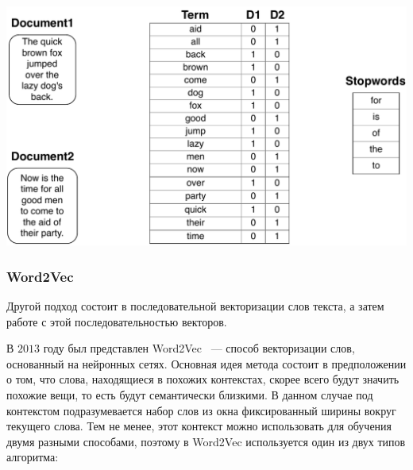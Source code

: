 \documentclass[../diploma.tex]{subfiles}
\begin{document}
   	\begin{minipage}{\linewidth}
   	    \centering
		\includegraphics[width=0.9\linewidth]{images/bag_of_words.pdf}
		\label{fig:bag_of_words}
   	\end{minipage}
    	
	\subsubsection{Word2Vec} 

	Другой подход состоит в последовательной векторизации слов текста, а затем работе с этой последовательностью векторов.

	В $2013$ году был представлен Word2Vec \cite{article:word2vec}~--- способ векторизации слов, основанный на нейронных сетях.
	Основная идея метода состоит в предположении о том, что слова, находящиеся в похожих контекстах, 
	скорее всего будут значить похожие вещи, то есть будут семантически близкими.
	В данном случае под контекстом подразумевается набор слов из окна фиксированный ширины вокруг текущего слова.
	Тем не менее, этот контекст можно использовать для обучения двумя разными способами, поэтому в Word2Vec используется один из двух типов алгоритма:
\end{document}

